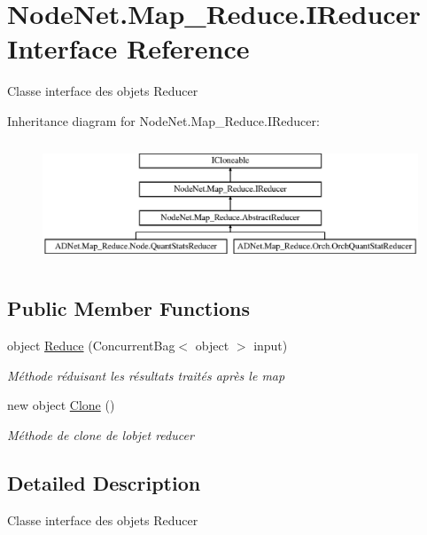 \hypertarget{interface_node_net_1_1_map___reduce_1_1_i_reducer}{}\section{Node\+Net.\+Map\+\_\+\+Reduce.\+I\+Reducer Interface Reference}
\label{interface_node_net_1_1_map___reduce_1_1_i_reducer}


Classe interface des objets Reducer  


Inheritance diagram for Node\+Net.\+Map\+\_\+\+Reduce.\+I\+Reducer\+:\begin{figure}[H]
\begin{center}
\leavevmode
\includegraphics[height=3.672131cm]{interface_node_net_1_1_map___reduce_1_1_i_reducer}
\end{center}
\end{figure}
\subsection*{Public Member Functions}
\begin{DoxyCompactItemize}
\item 
object \hyperlink{interface_node_net_1_1_map___reduce_1_1_i_reducer_a55b6605b1dda3d4fb9cdd361bec9a5cc}{Reduce} (Concurrent\+Bag$<$ object $>$ input)
\begin{DoxyCompactList}\small\item\em Méthode réduisant les résultats traités après le map \end{DoxyCompactList}\item 
new object \hyperlink{interface_node_net_1_1_map___reduce_1_1_i_reducer_a48dd811dab4aebe80a515bbaa4db8909}{Clone} ()
\begin{DoxyCompactList}\small\item\em Méthode de clone de l\textquotesingle{}objet reducer \end{DoxyCompactList}\end{DoxyCompactItemize}


\subsection{Detailed Description}
Classe interface des objets Reducer 



